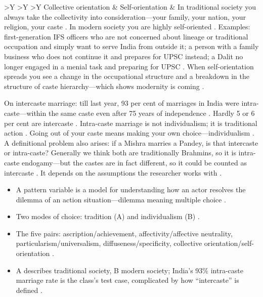 \begin{tabularx}{\textwidth}{>{\hsize}Y >{\hsize}Y >{\hsize}Y}
\midrule
Collective orientation & Self-orientation & In traditional society you always take the collectivity into consideration---your family, your nation, your religion, your caste . In modern society you are highly self-oriented . Examples: first-generation IFS officers who are not concerned about lineage or traditional occupation and simply want to serve India from outside it; a person with a family business who does not continue it and prepares for UPSC instead; a Dalit no longer engaged in a menial task and preparing for UPSC . When self-orientation spreads you see a change in the occupational structure and a breakdown in the structure of caste hierarchy---which shows modernity is coming . \\
\bottomrule
\end{tabularx}
\vspace{6pt}

\begin{DataFact}
On intercaste marriage: till last year, 93 per cent of marriages in India were intra-caste---within the same caste even after 75 years of independence . Hardly 5 or 6 per cent are intercaste .
Intra-caste marriage is not individualism; it is traditional action . Going out of your caste means making your own choice---individualism .
A definitional problem also arises: if a Mishra marries a Pandey, is that intercaste or intra-caste?  Generally we think both are traditionally Brahmins, so it is intra-caste endogamy---but the castes are in fact different, so it could be counted as intercaste . It depends on the assumptions the researcher works with .
\end{DataFact}

\begin{QuickRevision}
\begin{itemize}
    \item A pattern variable is a model for understanding how an actor resolves the dilemma of an action situation---dilemma meaning multiple choice .
    \item Two modes of choice: tradition (A) and individualism (B) .
    \item The five pairs: ascription/achievement, affectivity/affective neutrality, particularism/universalism, diffuseness/specificity, collective orientation/self-orientation .
    \item A describes traditional society, B modern society; India's 93\% intra-caste marriage rate is the class's test case, complicated by how ``intercaste'' is defined .
\end{itemize}
\end{QuickRevision}

